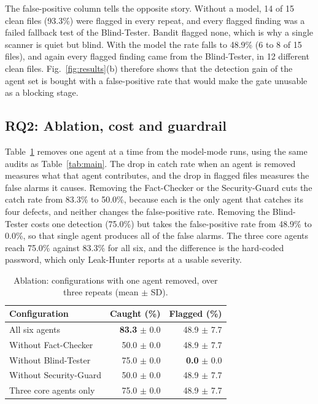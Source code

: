 \documentclass[12pt,onecolumn,draftclsnofoot]{IEEEtran}
\begin{document}
The false-positive column tells the opposite story. Without a model, 14 of 15 clean files (93.3\%) were flagged in every repeat, and every flagged finding was a failed fallback test of the Blind-Tester. Bandit flagged none, which is why a single scanner is quiet but blind. With the model the rate falls to 48.9\% (6 to 8 of 15 files), and again every flagged finding came from the Blind-Tester, in 12 different clean files. Fig.~\ref{fig:results}(b) therefore shows that the detection gain of the agent set is bought with a false-positive rate that would make the gate unusable as a blocking stage.
\subsection{RQ2: Ablation, cost and guardrail}
Table~\ref{tab:ablation} removes one agent at a time from the model-mode runs, using the same audits as Table~\ref{tab:main}. The drop in catch rate when an agent is removed measures what that agent contributes, and the drop in flagged files measures the false alarms it causes. Removing the Fact-Checker or the Security-Guard cuts the catch rate from 83.3\% to 50.0\%, because each is the only agent that catches its four defects, and neither changes the false-positive rate. Removing the Blind-Tester costs one detection (75.0\%) but takes the false-positive rate from 48.9\% to 0.0\%, so that single agent produces all of the false alarms. The three core agents reach 75.0\% against 83.3\% for all six, and the difference is the hard-coded password, which only Leak-Hunter reports at a usable severity.
\begin{table}[htbp]\centering
\caption{Ablation: configurations with one agent removed, over three repeats (mean $\pm$ SD).}
\label{tab:ablation}\small
\begin{tabular}{@{}p{.40\linewidth}rr@{}}\toprule
Configuration & Caught (\%) & Flagged (\%)\\\midrule
All six agents & \textbf{83.3} $\pm$ 0.0 & 48.9 $\pm$ 7.7\\
Without Fact-Checker & 50.0 $\pm$ 0.0 & 48.9 $\pm$ 7.7\\
Without Blind-Tester & 75.0 $\pm$ 0.0 & \textbf{0.0} $\pm$ 0.0\\
Without Security-Guard & 50.0 $\pm$ 0.0 & 48.9 $\pm$ 7.7\\
Three core agents only & 75.0 $\pm$ 0.0 & 48.9 $\pm$ 7.7\\
\bottomrule\end{tabular}
\end{table}
\end{document}
